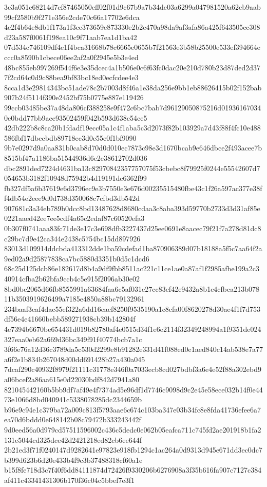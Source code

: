\documentclass[11pt,a4paper]{article}
\begin{document}
{3c3a051c68214d7cf87465050eff02f01d9c67b9a7b34de03a6299a047981520a62cb9aab99cf2580b9f271e356e2cde70c66a17702e6dca
4e2f4b64e8db1f173a1f3ce373659e873330e2b2c470a98da9af3afa86a425f643505cc308d23a587f0061f198ea10c9f71aab7ea1d1ba42
07d534c746109df4e1f4bca31668b78c6665e0655b7f21563e3b58b25500e533ef394664eccc0a8590b1cbece06ee2af2a0f2945e5b3e4ed
48bc855eb997269f544f6e3e35dcec4a1b506e0c6f63fc0dac20e210d780b23d87ded2d377f2cd64c0d9c88bea9bf83bc18ed0ecfcdee4e3
8cca1d3e29814343bc51ade78c2b7003d8f46a1e38da256e9bb1eb88626415b02f152bab907b24f5114f390e2452bf75b0775e887e119426
99ccb03485be37a48da806cf388258e9f472c6bc7bab7d96129050875216d019361670340e0bdd77bb9ace93502459f042b593d638c54ce5
42db222b8c8ca20b1fdadf19ecc05a1c4f1aba5c3d2073f82b103929a7d43f88f4fc10e488586fbf17dbecbdb89718ec3d0c55e0f1bf9090
9b7e0297d9a0aa831b0cab8d70d0d010ec7873c98e3d1670bcab9e646dbce2f493acee7b8515bf47a1186ba51544936d6e2e38612702d036
dbc2891ded7224d4631ba13c82970842357757075f53cbebc8f79925f0244e55542607d7054653b3182f10948d75942b4d19191dc6362f99
fb327df5a6b37619e6d3796ec9e3b7550e3e676d00235515480fbe43c1f26a597ac377e38ff4db54e2eee9d0d738d350068c7cfbd3db542d
907681c3a34eb789b0dcc8bd13487628d8680cdaa3c8aba393d59770b2733d3d31af85e0221aaed42ee7ee5cdf4a65c2edaf87c60520efa3
0b307f0741aaa83fc71de3e17c3e698dfb3227437d25ee0691e8aacec79f21f7a278d81dc8c29bc7d9e42ca344e2438c5754bc15dd897926
83013d109914ddcbda413312dde1ba59cdefad1ba870906389d07b18188a5f5c7aa64f2a9ed02a9d25877838ca7bc5880d3351b0d5c1dcd6
68c25d125dcb86e182617d8b4a9df9fbb8511ac221c11ce1ae0a87af1f2985afbe199a2c340914cfba2b62bfa9ccb4c5e915f2096ab30e02
8bd0be2065d66fb8555991a63684faa6c5af031e27cc83ef42e9432a8b1e4cfbca213b07811b3503919626499a7185e4850a88bc79132961
234baaf3eaf4dac55ef322a6dd16eacf8250f9535190a1c8cfa00f8620278d30ae4f1f7d753df56e4e41660bebb589271938cb39b142804f
4e7394b6670be654431d019b82780af4e0515d34f1e6e2114f32349248994a1f9351de024327eaa0eb62a669d36bc349f91f40774bcb7a1c
3f66e76a12d36c3789da5c530d2299e8b91282e331d41f088ed0e1aed840c14ab538e7a77a6f2e1b834b267048d00dd691428b27a430a045
7dcaf290c40932f8979f21111c31778e346f0a7033ecb8cd027bdbf3a6e4e52f88a302ebd9a06bcef2a86aa615e0d22030bdf842d7941a80
821045442160b5bb9df7af49e4f7374ad5e96df1d7746c9098d9c2e45e58ece032b14f0e4473e1066d8bd040941c5338078285dc2344659b
b96e9c94e1c379ba72a009c813f5793aae6c674c103ba347e03b34fc8e8fda41736efee6a7ea70d6bddd0e648142b08c79472b333243442f
9d0eed56a0d979cd57511596002c436c5dedc0e062b05eafca711c745fd2ae201918b1fa2131e5044cd325dce42d2421218ed82cb6ee644f
2b21ed3f71f0240147d9282641e97823e918fb1294c1ac264a0d9313d945e671dd3ec0dc7b399d623b6d20e433b4f9c3b37488318cf60a1e
b15f8fe718d3c7f40f6dd84111874d72426f9330206b6276908a3f35b616fa907c7127c384af411c43341431306b170f36c04c5bbef7e3f1
}
\end{document}

